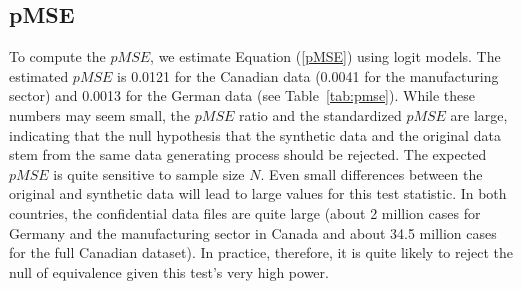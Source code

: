 %



\subsection{pMSE}



To compute the $pMSE$, we estimate Equation (\ref{pMSE}) using logit models. The estimated $pMSE$ is 0.0121 for the Canadian data (0.0041 for the manufacturing sector) and 0.0013 for the German data (see Table~\ref{tab:pmse}). While these numbers may seem small, the $pMSE$ ratio and the standardized $pMSE$ are large, indicating that the null hypothesis that the synthetic data and the original data stem from the same data generating process should be rejected. The expected $pMSE$ is quite sensitive to sample size $N$. Even small differences between the original and synthetic data will lead to large values for this test statistic. In both countries, the confidential data files are quite large (about 2 million cases for Germany and the manufacturing sector in Canada and about 34.5 million cases for the full Canadian dataset). In practice, therefore, it is quite likely to reject the null of equivalence  given this test's very high power. 



